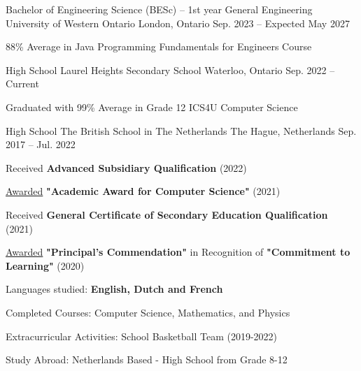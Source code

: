 


\begin{cventries}

  \cventry
    {Bachelor of Engineering Science (BESc) – 1st year General Engineering} %
    {University of Western Ontario} %
    {London, Ontario} %
    {Sep. 2023 -- Expected May 2027} %
    {
      \begin{cvitems}
      \item{88\% Average in Java Programming Fundamentals for Engineers Course}
      \end{cvitems}
    }


  \cventry
    {High School} %
    {Laurel Heights Secondary School} %
    {Waterloo, Ontario} %
    {Sep. 2022 -- Current} %
    {
      \begin{cvitems}
      \item{Graduated with 99\% Average in Grade 12 ICS4U Computer Science}
      \end{cvitems}
    }
  \cventry
    {High School} %
    {The British School in The Netherlands} %
    {The Hague, Netherlands} %
    {Sep. 2017 -- Jul. 2022} %
    {
      \begin{cvitems}
      \item {Received \textbf{Advanced Subsidiary Qualification} (2022)}
      \item {\underline{Awarded} \textbf{"Academic Award for Computer Science"} (2021)}
      \item {Received \textbf{General Certificate of Secondary Education Qualification} (2021)}
      \item {\underline{Awarded} \textbf{"Principal's Commendation"} in Recognition of \textbf{"Commitment to Learning"} (2020)}
      \item{Languages studied: \textbf{English, Dutch and French}}
      \item{Completed Courses: Computer Science, Mathematics, and Physics}
      \item{Extracurricular Activities: School Basketball Team (2019-2022)}
      \item{Study Abroad: Netherlands Based - High School from Grade 8-12}
      \end{cvitems}
    }


\end{cventries}


